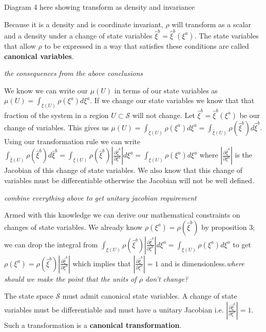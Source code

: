 \documentclass{article}
\begin{document}
Diagram 4 here showing transform as density and invariance

\begin{prop}
	Because it is a density and is coordinate invariant, $\rho$ will transform as a scalar and a density under a change of state variables $\hat{\xi}^b = \hat{\xi}^b(\xi^a)$. The state variables that allow $\rho$ to be expressed in a way that satisfies these conditions are called \textbf{canonical variables}.
\end{prop}

	\emph{the consequences from the above conclusions}

	We know we can write our $\mu(U)$ in terms of our state variables as $\mu(U) = \int_{\xi(U)} \rho(\xi^a)d\xi^a$. If we change our state variables we know that that fraction of the system in a region $U \subset \mathcal{S}$ will not change. Let $\hat{\xi}^b = \hat{\xi}^b(\xi^a)$ be our change of variables. This gives us $\mu(U) = \int_{\xi(U)} \rho(\xi^a)d\xi^a = \int_{\hat{\xi}(U)} \rho(\hat{\xi}^b)d\hat{\xi}^b$. Using our transformation rule we can write $\int_{\hat{\xi}(U)} \rho(\hat{\xi}^b)d\hat{\xi}^b = \int_{\xi(U)} \rho(\hat{\xi}^b)\left|\frac{\partial\hat{\xi}^b}{\partial\xi^a}\right|d\xi^a = \int_{\xi(U)} \rho(\xi^a)d\xi^a$ where $\left|\frac{\partial\hat{\xi}^b}{\partial\xi^a}\right|$ is the Jacobian of this change of state variables. We also know that this change of variables must be differentiable otherwise the Jacobian will not be well defined.

	\emph{combine everything above to get unitary jacobian requirement}

	Armed with this knowledge we can derive our mathematical constraints on changes of state variables. We already know $\rho(\xi^a) = \rho(\hat{\xi}^b)$ by proposition 3; we can drop the integral from $\int_{\xi(U)} \rho(\hat{\xi}^b)\left|\frac{\partial\hat{\xi}^b}{\partial\xi^a}\right|d\xi^a = \int_{\xi(U)} \rho(\xi^a)d\xi^a$ to get $\rho(\xi^a) = \rho(\hat{\xi}^b)\left|\frac{\partial\hat{\xi}^b}{\partial\xi^a}\right|$ which implies that $\left|\frac{\partial\hat{\xi}^b}{\partial\xi^a}\right| = 1$ and is dimensionless.\emph{where should we make the point that the units of $\rho$ don't change?}
		
\begin{prop}
	The state space $\mathcal{S}$ must admit canonical state variables. A change of state variables must be differentiable and must have a unitary Jacobian i.e. $\left|\frac{\partial\hat{\xi}^b}{\partial\xi^a}\right| = 1$. Such a transformation is a \textbf{canonical transformation}.
\end{prop}
\end{document}
